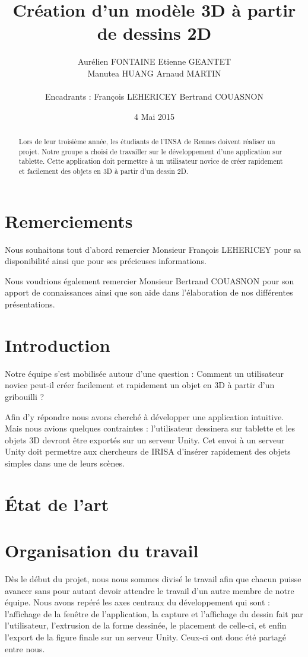 \documentclass[a4paper,11pt]{article}
\title{ \textbf{Création d'un modèle 3D à partir de dessins 2D} }
\author{ Aurélien \textsc{FONTAINE} Etienne \textsc{GEANTET} \\
	Manutea \textsc{HUANG} Arnaud \textsc{MARTIN} \\
	\\
	Encadrants : François \textsc{LEHERICEY}	Bertrand \textsc{COUASNON}}
\date{4 Mai 2015}                    %
\begin{document}
\maketitle                 %
\thispagestyle{empty}      %

\begin{abstract}
	Lors de leur troisième année, les étudiants de l'INSA de Rennes doivent réaliser un projet. Notre groupe a choisi de travailler sur le développement d'une application sur tablette. Cette application doit permettre à un utilisateur novice de créer rapidement et facilement des objets en 3D à partir d'un dessin 2D. 
\end{abstract}
	
	\section{Remerciements}
		Nous souhaitons tout d'abord remercier Monsieur François LEHERICEY pour sa disponibilité ainsi que pour ses précieuses informations.
		
		Nous voudrions également remercier Monsieur Bertrand COUASNON pour son apport de connaissances ainsi que son aide dans l'élaboration de nos différentes présentations.
				
	\section{Introduction} %
		Notre équipe s'est mobilisée autour d'une question : Comment un utilisateur novice peut-il créer facilement et rapidement un objet en 3D à partir d'un gribouilli ?
		
		Afin d'y répondre nous avons cherché à développer une application intuitive. Mais nous avions quelques contraintes : l'utilisateur dessinera sur tablette et les objets 3D devront être exportés sur un serveur Unity. Cet envoi à un serveur Unity doit permettre aux chercheurs de IRISA d'insérer rapidement des objets simples dans une de leurs scènes.
	\section{État de l'art}
	\section{Organisation du travail}
	Dès le début du projet, nous nous sommes divisé le travail afin que chacun puisse avancer sans pour autant devoir attendre le travail d'un autre membre de notre équipe. Nous avons repéré les axes centraux du développement qui sont : l'affichage de la fenêtre de l'application, la capture et l'affichage du dessin fait par l'utilisateur, l'extrusion de la forme dessinée, le placement de celle-ci, et enfin l'export de la figure finale sur un serveur Unity. Ceux-ci ont donc été partagé entre nous.
	
\end{document}
